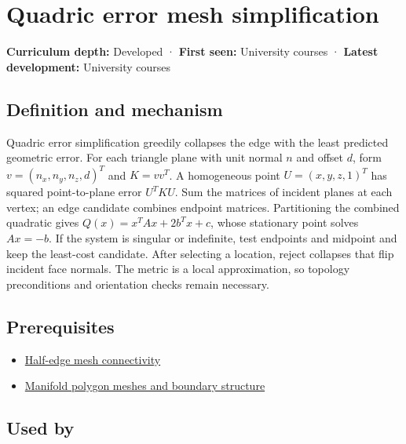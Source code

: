 \hypertarget{appendix-1dd4ad54ca57}{}\label{referencestart:appendix-1dd4ad54ca57}
\section{Quadric error mesh simplification}\label{appendix-1dd4ad54ca57-quadric-error-mesh-simplification}

\textbf{Curriculum depth:} Developed · \textbf{First seen:} University courses · \textbf{Latest development:} University courses

\begin{allmightroledefinition}

\subsection{Definition and mechanism}\label{appendix-1dd4ad54ca57-definition-and-mechanism}

Quadric error simplification greedily collapses the edge with the least predicted geometric error. For each triangle plane with unit normal \(n\) and offset \(d\), form \(v=(n_x,n_y,n_z,d)^T\) and \(K=vv^T\). A homogeneous point \(U=(x,y,z,1)^T\) has squared point-to-plane error \(U^TKU\). Sum the matrices of incident planes at each vertex; an edge candidate combines endpoint matrices. Partitioning the combined quadratic gives \(Q(x)=x^TAx+2b^Tx+c\), whose stationary point solves \(Ax=-b\). If the system is singular or indefinite, test endpoints and midpoint and keep the least-cost candidate. After selecting a location, reject collapses that flip incident face normals. The metric is a local approximation, so topology preconditions and orientation checks remain necessary.

\end{allmightroledefinition}

\subsection{Prerequisites}\label{appendix-1dd4ad54ca57-prerequisites}

\begin{itemize}
\tightlist
\item
  \hyperref[appendix-1aea26b2307f]{Half-edge mesh connectivity}
\item
  \hyperref[appendix-fab348609369]{Manifold polygon meshes and boundary structure}
\end{itemize}

\subsection{Used by}\label{appendix-1dd4ad54ca57-used-by}

